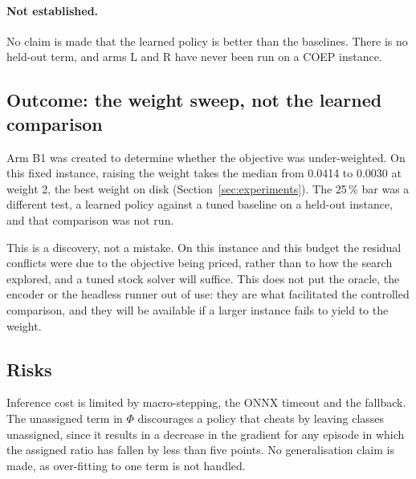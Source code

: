 \paragraph{Not established.} No claim is made that the learned policy is better than the
baselines. There is no held-out term, and arms L and R have never been run on a COEP instance.

\subsection{Outcome: the weight sweep, not the learned comparison}

Arm B1 was created to determine whether the objective was under-weighted. On this fixed instance,
raising the weight takes the median from 0.0414 to 0.0030 at weight 2, the best weight on disk
(Section~\ref{sec:experiments}). The 25\,\% bar was a different test, a learned policy against a
tuned baseline on a held-out instance, and that comparison was not run.

This is a discovery, not a mistake. On this instance and this budget the residual conflicts were
due to the objective being priced, rather than to how the search explored, and a tuned stock
solver will suffice. This does not put the oracle, the encoder or the headless runner out of use:
they are what facilitated the controlled comparison, and they will be available if a larger
instance fails to yield to the weight.

\subsection{Risks}

Inference cost is limited by macro-stepping, the ONNX timeout and the fallback. The unassigned
term in $\Phi$ discourages a policy that cheats by leaving classes unassigned, since it results in
a decrease in the gradient for any episode in which the assigned ratio has fallen by less than
five points. No generalisation claim is made, as over-fitting to one term is not handled.
